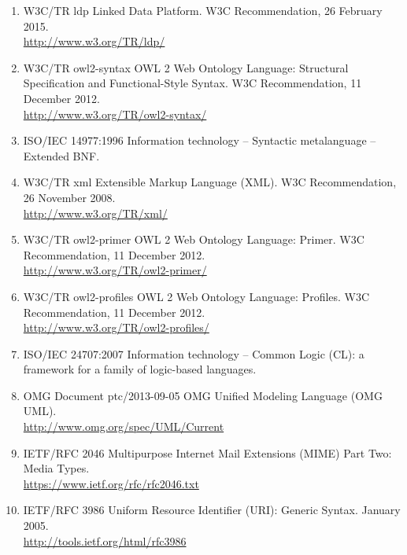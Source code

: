 \documentclass[10pt, a4paper]{isov2}
\begin{document}
\begin{enumerate}[label=\bfseries NR\arabic*, noitemsep]
  \item{W3C/TR ldp} {Linked Data Platform. W3C Recommendation, 26 February 2015.\\ \url{http://www.w3.org/TR/ldp/}}\label{nref-linked-data}
  \item{W3C/TR owl2-syntax} {OWL 2 Web Ontology Language: Structural Specification and Functional-Style Syntax. W3C Recommendation, 11 December 2012.\\ \url{http://www.w3.org/TR/owl2-syntax/}}\label{nref-OWL2}
  \item{ISO/IEC 14977:1996} {Information technology – Syntactic metalanguage – Extended BNF.}\label{nref-EBNF}
  \item{W3C/TR xml} {Extensible Markup Language (XML). W3C Recommendation, 26 November 2008. \\
  \url{http://www.w3.org/TR/xml/}}\label{nref-XML}
  \item{W3C/TR owl2-primer} {OWL 2 Web Ontology Language: Primer. W3C Recommendation, 11 December 2012. \\
  \url{http://www.w3.org/TR/owl2-primer/}}\label{nref-OWL2-primer}
  \item{W3C/TR owl2-profiles} {OWL 2 Web Ontology Language: Profiles. W3C Recommendation, 11 December 2012. \\
  \url{http://www.w3.org/TR/owl2-profiles/}}\label{nref-OWL2-profiles}
  \item{ISO/IEC 24707:2007} {Information technology – Common Logic (CL): a framework for a family of logic-based languages.}\label{nref-CL}
  \item{OMG Document ptc/2013-09-05} {OMG Unified Modeling Language (OMG UML).\\
  \url{http://www.omg.org/spec/UML/Current}}\label{nref-UML} %
  \item{IETF/RFC 2046} {Multipurpose Internet Mail Extensions (MIME)
    Part Two: Media Types.\\
    \url{https://www.ietf.org/rfc/rfc2046.txt}}\label{nref-text/plain}
  \item{IETF/RFC 3986} {Uniform Resource Identifier (URI): Generic Syntax. January 2005.\\ \url{http://tools.ietf.org/html/rfc3986}}\label{nref-URI}

\end{enumerate}
\end{document}
